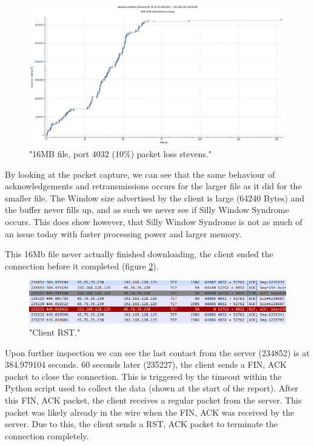\documentclass[12pt]{article}
\begin{document}
\begin{figure}[!htbp]
  \centering
  \includegraphics[width=\linewidth]{4032-16M-stevens.jpeg}
  \caption{"16MB file, port 4032 (10\%) packet loss stevens."}
  \label{figure6: 4032:16M Stevens}
\end{figure}

By looking at the packet capture, we can see that the same behaviour of acknowledgements and retransmissions occurs for the larger file as it did for the smaller file.
The Window size advertised by the client is large (64240 Bytes) and the buffer never fills up, and as such we never see if Silly Window Syndrome occurs.
This does show however, that Silly Window Syndrome is not as much of an issue today with faster processing power and larger memory.

This 16Mb file never actually finished downloading, the client ended the connection before it completed (figure \ref{figure7: 4032:16M RST}).

\begin{figure}[!htbp]
  \centering
  \includegraphics[width=\linewidth]{4032-16M-RST.PNG}
  \caption{"Client RST."}
  \label{figure7: 4032:16M RST}
\end{figure}

Upon further inspection we can see the last contact from the server (234852) is at 384.979104 seconds.
60 seconds later (235227), the client sends a FIN, ACK packet to close the connection.
This is triggered by the timeout within the Python script used to collect the data (shown at the start of the report).
After this FIN, ACK packet, the client receives a regular packet from the server. 
This packet was likely already in the wire when the FIN, ACK was received by the server.
Due to this, the client sends a RST, ACK packet to terminate the connection completely.
\end{document}
